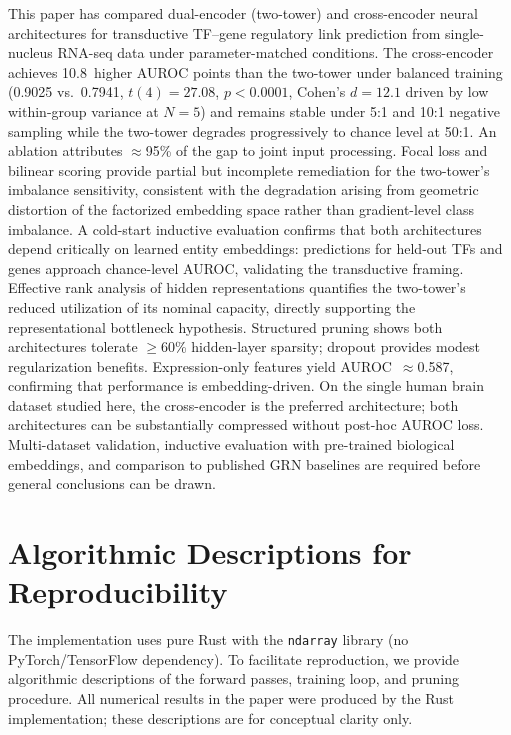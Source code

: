 \documentclass[journal]{IEEEtran}
\begin{document}
This paper has compared dual-encoder (two-tower) and cross-encoder neural
architectures for transductive TF--gene regulatory link prediction from
single-nucleus RNA-seq data under parameter-matched conditions. The
cross-encoder achieves 10.8~higher AUROC points than the two-tower under
balanced training (0.9025 vs.\ 0.7941, $t(4)=27.08$, $p < 0.0001$,
Cohen's $d=12.1$ driven by low within-group variance at $N=5$) and remains
stable under 5:1 and 10:1 negative sampling while the two-tower degrades
progressively to chance level at 50:1. An ablation attributes $\approx$95\%
of the gap to joint input processing. Focal loss and bilinear scoring
provide partial but incomplete remediation for the two-tower's imbalance
sensitivity, consistent with the degradation arising from geometric
distortion of the factorized embedding space rather than gradient-level
class imbalance.
A cold-start inductive evaluation confirms that both architectures depend
critically on learned entity embeddings: predictions for held-out TFs and
genes approach chance-level AUROC, validating the transductive framing.
Effective rank analysis of hidden representations quantifies the two-tower's
reduced utilization of its nominal capacity, directly supporting the
representational bottleneck hypothesis. Structured pruning shows both
architectures tolerate $\geq$60\% hidden-layer sparsity; dropout provides
modest regularization benefits. Expression-only features yield
AUROC~$\approx$0.587, confirming that performance is embedding-driven.
On the single human brain dataset studied here, the cross-encoder is the
preferred architecture; both architectures can be substantially compressed
without post-hoc AUROC loss. Multi-dataset validation, inductive evaluation
with pre-trained biological embeddings, and comparison to published GRN
baselines are required before general conclusions can be drawn.

\appendix
\section{Algorithmic Descriptions for Reproducibility}
\label{app:pseudocode}

The implementation uses pure Rust with the \texttt{ndarray} library (no
PyTorch/TensorFlow dependency). To facilitate reproduction, we provide
algorithmic descriptions of the forward passes, training loop, and pruning
procedure. All numerical results in the paper were produced by the Rust
implementation; these descriptions are for conceptual clarity only.
\end{document}
